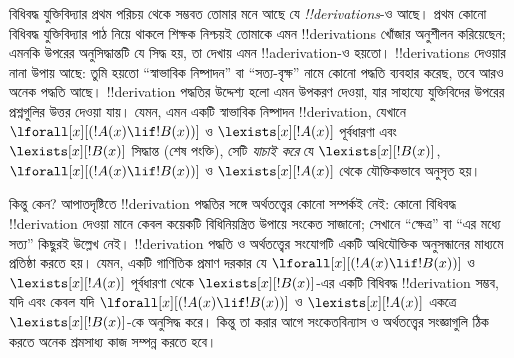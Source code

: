 \documentclass[../../../include/open-logic-section]{subfiles}
\begin{document}
বিধিবদ্ধ যুক্তিবিদ্যার প্রথম পরিচয় থেকে সম্ভবত তোমার মনে আছে যে
\emph{!!{derivation}s}-ও আছে। প্রথম কোনো বিধিবদ্ধ যুক্তিবিদ্যার পাঠ নিয়ে
থাকলে শিক্ষক নিশ্চয়ই তোমাকে এমন !!{derivation}s খোঁজার অনুশীলন
করিয়েছেন; এমনকি উপরের অনুসিদ্ধান্তটি যে সিদ্ধ হয়, তা দেখায় এমন
!!a{derivation}-ও হয়তো। !!{derivation}s দেওয়ার নানা উপায় আছে: তুমি
হয়তো “স্বাভাবিক নিষ্পাদন” বা “সত্য-বৃক্ষ” নামে কোনো পদ্ধতি ব্যবহার করেছ,
তবে আরও অনেক পদ্ধতি আছে। !!{derivation} পদ্ধতির উদ্দেশ্য হলো এমন উপকরণ
দেওয়া, যার সাহায্যে যুক্তিবিদের উপরের প্রশ্নগুলির উত্তর দেওয়া যায়।
যেমন, এমন একটি স্বাভাবিক নিষ্পাদন !!{derivation}, যেখানে
$\lforall[x][(!A(x) \lif !B(x))]$ ও $\lexists[x][!A(x)]$ পূর্বধারণা এবং
$\lexists[x][!B(x)]$ সিদ্ধান্ত (শেষ পংক্তি), সেটি \emph{যাচাই করে} যে
$\lexists[x][!B(x)]$, $\lforall[x][(!A(x) \lif !B(x))]$ ও
$\lexists[x][!A(x)]$ থেকে যৌক্তিকভাবে অনুসৃত হয়।

কিন্তু কেন? আপাতদৃষ্টিতে !!{derivation} পদ্ধতির সঙ্গে অর্থতত্ত্বের কোনো
সম্পর্কই নেই: কোনো বিধিবদ্ধ !!{derivation} দেওয়া মানে কেবল কয়েকটি
বিধিনিয়ন্ত্রিত উপায়ে সংকেত সাজানো; সেখানে “ক্ষেত্র” বা “এর মধ্যে সত্য”
কিছুরই উল্লেখ নেই। !!{derivation} পদ্ধতি ও অর্থতত্ত্বের সংযোগটি একটি
অধিযৌক্তিক অনুসন্ধানের মাধ্যমে প্রতিষ্ঠা করতে হয়। যেমন, একটি গাণিতিক
প্রমাণ দরকার যে $\lforall[x][(!A(x) \lif !B(x))]$ ও
$\lexists[x][!A(x)]$ পূর্বধারণা থেকে $\lexists[x][!B(x)]$-এর একটি
বিধিবদ্ধ !!{derivation} সম্ভব, যদি এবং কেবল যদি
$\lforall[x][(!A(x) \lif !B(x))]$ ও $\lexists[x][!A(x)]$ একত্রে
$\lexists[x][!B(x)]$-কে অনুসিদ্ধ করে। কিন্তু তা করার আগে সংকেতবিন্যাস ও
অর্থতত্ত্বের সংজ্ঞাগুলি ঠিক করতে অনেক শ্রমসাধ্য কাজ সম্পন্ন করতে হবে।
\end{document}
